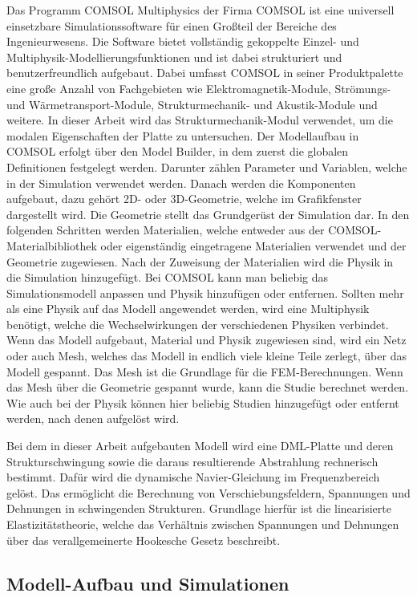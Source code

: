 Das Programm COMSOL Multiphysics der Firma COMSOL ist eine universell einsetzbare Simulationssoftware für einen Großteil der Bereiche des Ingenieurwesens. Die Software bietet vollständig gekoppelte Einzel- und Multiphysik-Modellierungsfunktionen und ist dabei strukturiert und benutzerfreundlich aufgebaut. Dabei umfasst COMSOL in seiner Produktpalette eine große Anzahl von Fachgebieten wie Elektromagnetik-Module, Strömungs- und Wärmetransport-Module, Strukturmechanik- und Akustik-Module und weitere. In dieser Arbeit wird das Strukturmechanik-Modul verwendet, um die modalen Eigenschaften der Platte zu untersuchen. Der Modellaufbau in COMSOL erfolgt über den Model Builder, in dem zuerst die globalen Definitionen festgelegt werden. Darunter zählen Parameter und Variablen, welche in der Simulation verwendet werden. Danach werden die Komponenten aufgebaut, dazu gehört 2D- oder 3D-Geometrie, welche im Grafikfenster dargestellt wird. Die Geometrie stellt das Grundgerüst der Simulation dar. In den folgenden Schritten werden Materialien, welche entweder aus der COMSOL-Materialbibliothek oder eigenständig eingetragene Materialien verwendet und der Geometrie zugewiesen. Nach der Zuweisung der Materialien wird die Physik in die Simulation hinzugefügt. Bei COMSOL kann man beliebig das Simulationsmodell anpassen und Physik hinzufügen oder entfernen. Sollten mehr als eine Physik auf das Modell angewendet werden, wird eine Multiphysik benötigt, welche die Wechselwirkungen der verschiedenen Physiken verbindet. Wenn das Modell aufgebaut, Material und Physik zugewiesen sind, wird ein Netz oder auch Mesh, welches das Modell in endlich viele kleine Teile zerlegt, über das Modell gespannt. Das Mesh ist die Grundlage für die FEM-Berechnungen. Wenn das Mesh über die Geometrie gespannt wurde, kann die Studie berechnet werden. Wie auch bei der Physik können hier beliebig Studien hinzugefügt oder entfernt werden, nach denen aufgelöst wird. 

Bei dem in dieser Arbeit aufgebauten Modell wird eine DML-Platte und deren Strukturschwingung sowie die daraus resultierende Abstrahlung rechnerisch bestimmt. Dafür wird die dynamische Navier-Gleichung im Frequenzbereich gelöst. Das ermöglicht die Berechnung von Verschiebungsfeldern, Spannungen und Dehnungen in schwingenden Strukturen. Grundlage hierfür ist die linearisierte Elastizitätstheorie, welche das Verhältnis zwischen Spannungen und Dehnungen über das verallgemeinerte Hookesche Gesetz beschreibt. 




\subsection{Modell-Aufbau und Simulationen}

